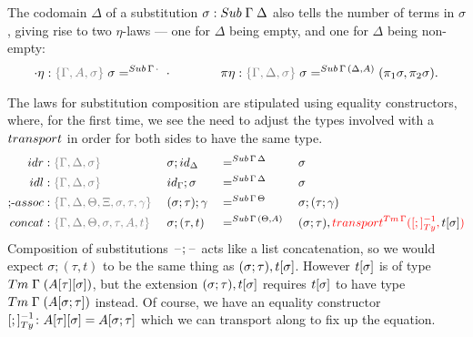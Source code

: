 \documentclass[a4paper,UKenglish,numberwithinsect,cleveref,thm-restate]{lipics-v2021}
\begin{document}
The codomain $\Delta$ of a substitution $\sigma:\Sub\;\Gamma\;\Delta$ also tells the number of terms in $\sigma$, giving rise to two $\eta$-laws --- one for $\Delta$ being empty, and one for $\Delta$ being non-empty:
\[
  \emptyctx\eta : \implicit{\Gamma, A, \sigma}\; \sigma        =^{\Sub\,\Gamma\,\emptyctx} \; \emptysub
  \qquad\qquad
  \pi\eta       : \implicit{\Gamma, \Delta, \sigma}\; \sigma   =^{\Sub\,\Gamma\,(\Delta, A)} (\pi_1 \sigma, \pi_2 \sigma).
\]

The laws for substitution composition are stipulated using equality constructors, where, for the first time, we see the need to adjust the types involved with a $\transp$ in order for both sides to have the same type.
\begin{alignat*}{5}
  \mathsf{idr}    & : \implicit{\Gamma, \Delta, \sigma} && {\sigma ; \idS_{\Delta}} && =^{\Sub\,\Gamma\,\Delta} && {\sigma} \\
  \mathsf{idl}    & : \implicit{\Gamma, \Delta, \sigma} && {\idS_{\Gamma} ; \sigma} && =^{\Sub\,\Gamma\,\Delta} && {\sigma} \\
  \text{;-}\mathsf{assoc} & : \implicit{\Gamma, \Delta, \Theta, \Xi, \sigma, \tau, \gamma}\; && (\sigma ; \tau) ; \gamma && =^{\Sub\,\Gamma\,\Theta} &&  \sigma ; (\tau ; \gamma) \\
  \mathsf{concat} & : \implicit{\Gamma, \Delta, \Theta, \sigma, \tau, A, t} \; && \sigma ; (\tau , t)      && =^{\Sub\,\Gamma\,(\Theta, A)} \; &&  (\sigma ; \tau) , \alert{\transfib{\Tm\,\Gamma}{[;]_{\Ty}^{-1}}{\color{black}\sub{t}{\sigma}}}
\end{alignat*}
%
Composition of substitutions $\mathord{\hspace{1pt}\text{--}\hspace{1pt}};\mathord{\hspace{1pt}\text{--}\hspace{1pt}}$ acts like a list concatenation, so
we would expect $\sigma; (\tau, t)$ to be the same thing as $(\sigma; \tau), {{t}[ \sigma ]}$. However ${{t}[ \sigma ]}$ is of type $\Tm\;\Gamma\;(\sub{\sub{A}{\tau}}{\sigma})$, but the extension $(\sigma; \tau), {{t}[ \sigma ]}$ requires ${{t}[ \sigma ]}$ to have type $\Tm\;\Gamma\;(\sub{A}{\sigma; \tau})$ instead. Of course, we have an equality constructor $[;]_{\Ty}^{-1}\colon \sub{\sub{A}{\tau}}{\sigma} = \sub{A}{\sigma;\tau}$ which we can transport along to fix up the equation.

\end{document}
